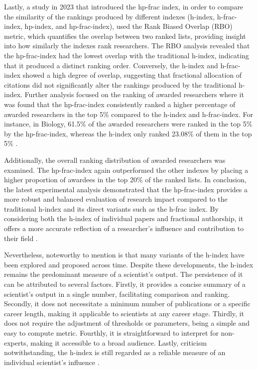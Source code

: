 Lastly, a study in 2023 that introduced the hp-frac index, in order to compare
the similarity of the rankings produced by different indexes (h-index,
h-frac-index, hp-index, and hp-frac-index), used the Rank Biased Overlap (RBO)
metric, which quantifies the overlap between two ranked lists, providing
insight into how similarly the indexes rank researchers. The RBO analysis
revealed that the hp-frac-index had the lowest overlap with the traditional
h-index, indicating that it produced a distinct ranking order. Conversely, the
h-index and h-frac-index showed a high degree of overlap, suggesting that
fractional allocation of citations did not significantly alter the rankings
produced by the traditional h-index. Further analysis focused on the ranking of
awarded researchers where it was found that the hp-frac-index consistently
ranked a higher percentage of awarded researchers in the top 5\% compared to
the h-index and h-frac-index. For instance, in Biology, 61.5\% of the awarded
researchers were ranked in the top 5\% by the hp-frac-index, whereas the
h-index only ranked 23.08\% of them in the top 5\% \cite{singhal2023hp}.

Additionally, the overall ranking distribution of awarded researchers was
examined. The hp-frac-index again outperformed the other indexes by placing a
higher proportion of awardees in the top 20\% of the ranked lists. In
conclusion, the latest experimental analysis demonstrated that the
hp-frac-index provides a more robust and balanced evaluation of research impact
compared to the traditional h-index and its direct variants such as the h-frac
index. By considering both the h-index of individual papers and fractional
authorship, it offers a more accurate reflection of a researcher’s influence
and contribution to their field \cite{singhal2023hp}.

Nevertheless, noteworthy to mention is that many variants of the h-index
have been explored and proposed across time. Despite these developments, the
h-index remains the predominant measure of a scientist’s output. The
persistence of it can be attributed to several factors. Firstly, it provides a
concise summary of a scientist’s output in a single number, facilitating
comparison and ranking. Secondly, it does not necessitate a minimum number of
publications or a specific career length, making it applicable to scientists at
any career stage. Thirdly, it does not require the adjustment of thresholds or
parameters, being a simple and easy to compute metric. Fourthly, it is
straightforward to interpret for non-experts, making it accessible to a broad
audience. Lastly, criticism notwithstanding, the h-index is still regarded as a
reliable measure of an individual scientist’s influence \cite{koltun2021h}.
